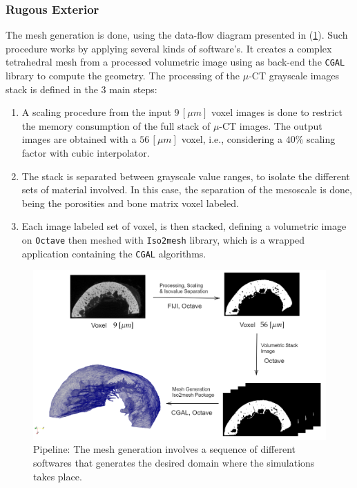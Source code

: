 \subsubsection{Rugous Exterior}
The mesh generation is done, using the data-flow diagram presented in (\ref{DiagramMeshGeneration}). Such procedure works by applying several kinds of software's. It creates a complex tetrahedral mesh from a processed volumetric image using as back-end the \texttt{CGAL} library to compute the geometry. 
The processing of the $\mu$-CT grayscale images stack is defined in the 3 main steps:
\begin{enumerate}
    \item A scaling procedure from the input $9 \, [\mu m]$ voxel images is done to restrict the memory consumption of the full stack of $\mu$-CT images. The output images are obtained with a $56 \, [\mu m]$ voxel, i.e., considering a $40 \%$ scaling factor with cubic interpolator.
    \item The stack is separated between grayscale value ranges, to isolate the different sets of material involved. In this case, the separation of the mesoscale is done, being the porosities and bone matrix voxel labeled.
    \item Each image labeled set of voxel, is then stacked, defining a volumetric image on \texttt{Octave} then meshed with \texttt{Iso2mesh} library, which is a wrapped application containing the \texttt{CGAL} algorithms.
\end{enumerate}
\begin{figure}[!h]
	\centering
	\includegraphics[scale=.5]{images/ImgExt/DiagramMeshGeneration.png}
	\caption{Pipeline: The mesh generation involves a sequence of different softwares that generates the desired domain where the simulations takes place.}
	\label{DiagramMeshGeneration}
\end{figure} 

